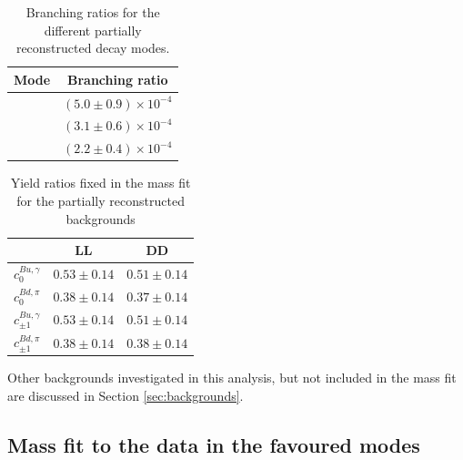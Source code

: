 \begin{table}[h]
\centering
\begin{tabular}{c|c}
Mode & Branching ratio \\
\hline
\decay{\Bm}{(\decay{\Dstarz}{\Dz\piz})\Kstarm} & $(5.0 \pm 0.9) \times 10^{-4}$ \\
\decay{\Bm}{(\decay{\Dstarz}{\Dz\gamma})\Kstarm} & $(3.1 \pm 0.6) \times 10^{-4}$ \\
\decay{\Bd}{(\decay{\Dstarp}{\Dz\pip})\Kstarm} & $(2.2 \pm 0.4) \times 10^{-4}$ \\
\end{tabular}
\caption{Branching ratios for the different partially reconstructed decay modes.}
\label{partrecoBRs}
\end{table}

\begin{table}[h]
\centering
\begin{tabular}{ccc}
\hline
& LL & DD \\
\hline
$c^{Bu,\gamma}_0$ & $0.53 \pm 0.14$ & $0.51 \pm 0.14$ \\[3mm]
$c^{Bd,\pi}_0$ & $0.38 \pm 0.14$ & $0.37 \pm 0.14$ \\[3mm]
$c^{Bu,\gamma}_{\pm 1}$ & $0.53 \pm 0.14$ & $0.51 \pm 0.14$ \\[3mm]
$c^{Bd,\pi}_{\pm 1}$ & $0.38 \pm 0.14$ & $0.38 \pm 0.14$ \\[3mm]
\hline
\end{tabular}
\caption{Yield ratios fixed in the mass fit for the partially reconstructed backgrounds}
\label{fixedyieldratios}
\end{table}

Other backgrounds investigated in this analysis, but not included in the mass fit are discussed in Section \ref{sec:backgrounds}.


\subsection{Mass fit to the data in the favoured modes}
\label{sec:massfit:fit}


